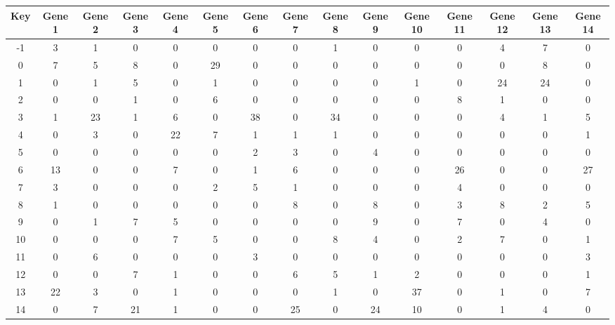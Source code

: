 \begin{tabular}{|c|c|c|c|c|c|c|c|c|c|c|c|c|c|c|}
\hline
Key & Gene 1 & Gene 2 & Gene 3 & Gene 4 & Gene 5 & Gene 6 & Gene 7 & Gene 8 & Gene 9 & Gene 10 & Gene 11 & Gene 12 & Gene 13 & Gene 14 \\
\hline
-1 & 3 & 1 & 0 & 0 & 0 & 0 & 0 & 1 & 0 & 0 & 0 & 4 & 7 & 0 \\
0 & 7 & 5 & 8 & 0 & 29 & 0 & 0 & 0 & 0 & 0 & 0 & 0 & 8 & 0 \\
1 & 0 & 1 & 5 & 0 & 1 & 0 & 0 & 0 & 0 & 1 & 0 & 24 & 24 & 0 \\
2 & 0 & 0 & 1 & 0 & 6 & 0 & 0 & 0 & 0 & 0 & 8 & 1 & 0 & 0 \\
3 & 1 & 23 & 1 & 6 & 0 & 38 & 0 & 34 & 0 & 0 & 0 & 4 & 1 & 5 \\
4 & 0 & 3 & 0 & 22 & 7 & 1 & 1 & 1 & 0 & 0 & 0 & 0 & 0 & 1 \\
5 & 0 & 0 & 0 & 0 & 0 & 2 & 3 & 0 & 4 & 0 & 0 & 0 & 0 & 0 \\
6 & 13 & 0 & 0 & 7 & 0 & 1 & 6 & 0 & 0 & 0 & 26 & 0 & 0 & 27 \\
7 & 3 & 0 & 0 & 0 & 2 & 5 & 1 & 0 & 0 & 0 & 4 & 0 & 0 & 0 \\
8 & 1 & 0 & 0 & 0 & 0 & 0 & 8 & 0 & 8 & 0 & 3 & 8 & 2 & 5 \\
9 & 0 & 1 & 7 & 5 & 0 & 0 & 0 & 0 & 9 & 0 & 7 & 0 & 4 & 0 \\
10 & 0 & 0 & 0 & 7 & 5 & 0 & 0 & 8 & 4 & 0 & 2 & 7 & 0 & 1 \\
11 & 0 & 6 & 0 & 0 & 0 & 3 & 0 & 0 & 0 & 0 & 0 & 0 & 0 & 3 \\
12 & 0 & 0 & 7 & 1 & 0 & 0 & 6 & 5 & 1 & 2 & 0 & 0 & 0 & 1 \\
13 & 22 & 3 & 0 & 1 & 0 & 0 & 0 & 1 & 0 & 37 & 0 & 1 & 0 & 7 \\
14 & 0 & 7 & 21 & 1 & 0 & 0 & 25 & 0 & 24 & 10 & 0 & 1 & 4 & 0 \\
\hline
\end{tabular}